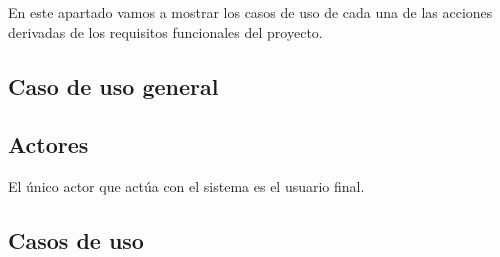 En este apartado vamos a mostrar los casos de uso de cada una de las acciones derivadas de los requisitos funcionales del proyecto.

\subsection{Caso de uso general}


\subsection{Actores}

El único  actor que actúa con el sistema es el usuario final.

\subsection{Casos de uso}


